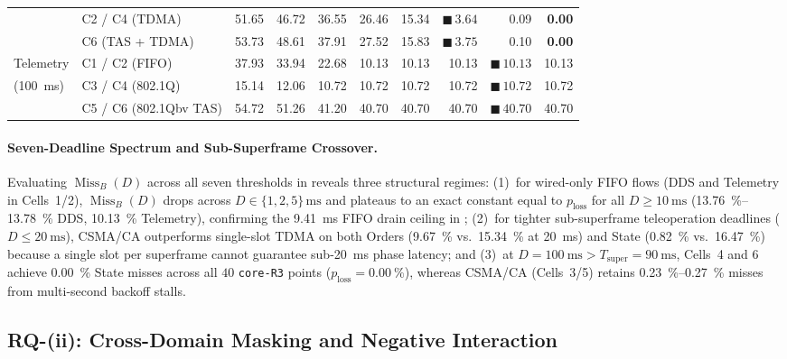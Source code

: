 \documentclass[11pt,a4paper]{article}
\newcommand{\Tsuper}{\ensuremath{T_{\mathrm{super}}}}
\newcommand{\MissB}{\ensuremath{\operatorname{Miss}_B}}
\newcommand{\ploss}{\ensuremath{p_{\mathrm{loss}}}}
\begin{document}
\begin{table}[!tb]
\begin{tabular}{l l r r r r r r r r}
 & C2 / C4 (TDMA) & 51.65 & 46.72 & 36.55 & 26.46 & 15.34 & $\blacksquare\,\mathbf{3.64}$ & 0.09 & \textbf{0.00} \\
 & C6 (TAS + TDMA) & 53.73 & 48.61 & 37.91 & 27.52 & 15.83 & $\blacksquare\,\mathbf{3.75}$ & 0.10 & \textbf{0.00} \\
\midrule
Telemetry & C1 / C2 (FIFO) & 37.93 & 33.94 & 22.68 & 10.13 & 10.13 & 10.13 & $\blacksquare\,\mathbf{10.13}$ & 10.13 \\
(\qty{100}{\milli\second}) & C3 / C4 (802.1Q) & 15.14 & 12.06 & 10.72 & 10.72 & 10.72 & 10.72 & $\blacksquare\,\mathbf{10.72}$ & 10.72 \\
 & C5 / C6 (802.1Qbv TAS) & 54.72 & 51.26 & 41.20 & 40.70 & 40.70 & 40.70 & $\blacksquare\,\mathbf{40.70}$ & 40.70 \\
\bottomrule
\end{tabular}
\end{table}

\paragraph{Seven-Deadline Spectrum and Sub-Superframe Crossover.}
Evaluating $\MissB(D)$ across all seven thresholds in  reveals three structural regimes: (1)~for wired-only FIFO flows (DDS and Telemetry in Cells~1/2), $\MissB(D)$ drops across $D \in \{1, 2, 5\}\,\text{ms}$ and plateaus to an exact constant equal to $\ploss$ for all $D \ge \qty{10}{\milli\second}$ (\qtyrange{13.76}{13.78}{\percent} DDS, \qty{10.13}{\percent} Telemetry), confirming the \qty{9.41}{\milli\second} FIFO drain ceiling in ; (2)~for tighter sub-superframe teleoperation deadlines ($D \le \qty{20}{\milli\second}$), CSMA/CA outperforms single-slot TDMA on both Orders (\qty{9.67}{\percent} vs.\ \qty{15.34}{\percent} at \qty{20}{\milli\second}) and State (\qty{0.82}{\percent} vs.\ \qty{16.47}{\percent}) because a single slot per superframe cannot guarantee sub-\qty{20}{\milli\second} phase latency; and (3)~at $D = \qty{100}{\milli\second} > \Tsuper = \qty{90}{\milli\second}$, Cells~4 and 6 achieve \qty{0.00}{\percent} State misses across all $40$ \texttt{core-R3} points ($\ploss = \qty{0.00}{\percent}$), whereas CSMA/CA (Cells~3/5) retains \qtyrange{0.23}{0.27}{\percent} misses from multi-second backoff stalls.

\subsection{RQ-(ii): Cross-Domain Masking and Negative Interaction}
\label{sec:rq2}
\end{document}
